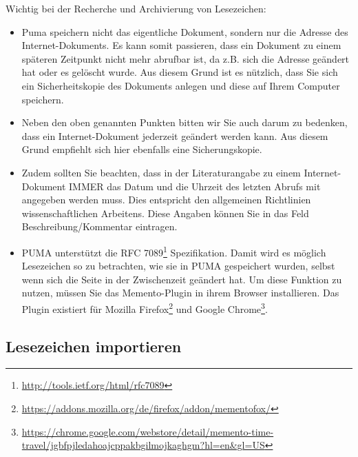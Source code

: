 \documentclass[b5paper,11pt,twoside]{scrbook} %
\begin{document}
Wichtig bei der Recherche und Archivierung von Lesezeichen:
\begin{itemize}
    \item Puma speichern nicht das eigentliche Dokument, sondern nur die Adresse des Internet-Dokuments. Es kann somit passieren, dass ein Dokument zu einem späteren Zeitpunkt nicht mehr abrufbar ist, da z.B. sich die Adresse geändert hat oder es gelöscht wurde.  Aus diesem Grund ist es nützlich, dass Sie sich ein Sicherheitskopie des Dokuments anlegen und diese auf Ihrem Computer speichern.
    \item Neben den oben genannten Punkten bitten wir Sie auch darum zu bedenken, dass ein Internet-Dokument jederzeit geändert werden kann. Aus diesem Grund empfiehlt sich hier ebenfalls eine Sicherungskopie. 
    \item Zudem sollten Sie beachten, dass in der Literaturangabe zu einem Internet-Dokument IMMER das Datum und die Uhrzeit des letzten Abrufs mit angegeben werden muss. Dies entspricht den allgemeinen Richtlinien wissenschaftlichen Arbeitens. Diese Angaben können Sie in das Feld Beschreibung/Kommentar eintragen.
    \item PUMA unterstützt die RFC 7089\footnote{\url{http://tools.ietf.org/html/rfc7089}} Spezifikation. Damit wird es möglich Lesezeichen so zu betrachten, wie sie in PUMA gespeichert wurden, selbst wenn sich die Seite in der Zwischenzeit geändert hat. Um diese Funktion zu nutzen, müssen Sie das Memento-Plugin in ihrem Browser installieren. Das Plugin existiert für Mozilla Firefox\footnote{\url{https://addons.mozilla.org/de/firefox/addon/mementofox/}} und Google Chrome\footnote{\url{https://chrome.google.com/webstore/detail/memento-time-travel/jgbfpjledahoajcppakbgilmojkaghgm?hl=en&gl=US}}. 
\end{itemize} 
\subsection{Lesezeichen importieren}
\end{document}
